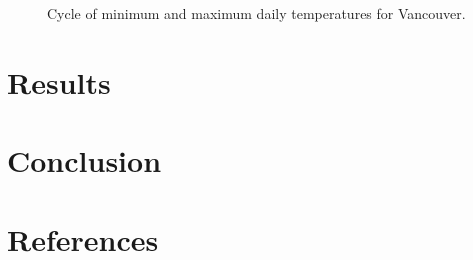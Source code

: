 \documentclass{article}
\begin{document}
\begin{enumerate}
\begin{center}
\begin{figure}[!h]
\caption{Cycle of minimum and maximum daily temperatures for Vancouver.}
\label{gdd_min-max}
\end{figure}
\end{center}



\end{enumerate}







\section{ \bf Results}





\section{Conclusion}


\section{References}
\end{document}
